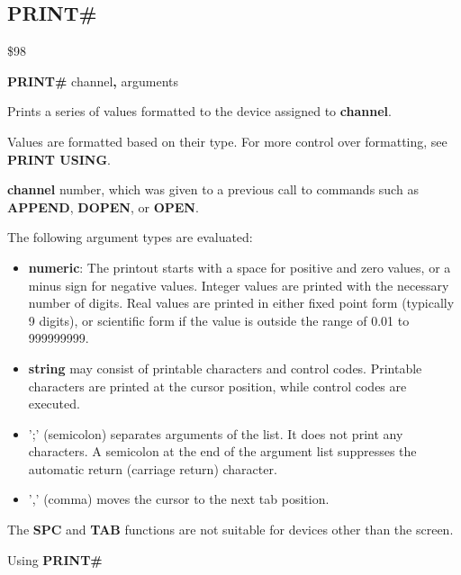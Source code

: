 
\newpage
\subsection{PRINT\#}
\begin{description}[leftmargin=2cm,style=nextline]
\item [Token:]    \$98

\item [Format:]   {\bf PRINT\#} channel{\bf,} arguments

\item [Usage:]    Prints a series of values formatted to the device assigned to {\bf channel}.

                  Values are formatted based on their type. For more control over formatting, see {\bf PRINT USING}.

                  {\bf channel} number, which was given to a previous call to commands such as {\bf APPEND}, {\bf DOPEN}, or {\bf OPEN}.

                  The following argument types are evaluated:
                  \begin{itemize}
                     \item {\bf numeric}: The printout starts with a space for positive and zero values, or a minus sign for negative values. Integer values are printed with the necessary number of digits. Real values are printed in either fixed point form (typically 9 digits), or scientific form if the value is outside the range of 0.01 to 999999999.
                     \item {\bf string} may consist of printable characters and control codes. Printable characters are printed at the cursor position, while control codes are executed.
                     \item ';' (semicolon) separates arguments of the list. It does not print any characters. A semicolon at the end of the argument list suppresses the automatic return (carriage return) character.
                     \item ',' (comma) moves the cursor to the next tab position.
                  \end{itemize}

\item [Remarks:]  The {\bf SPC} and {\bf TAB} functions are not suitable for devices other than the screen.

\item [Example:]  Using {\bf PRINT\#}


\end{description}

